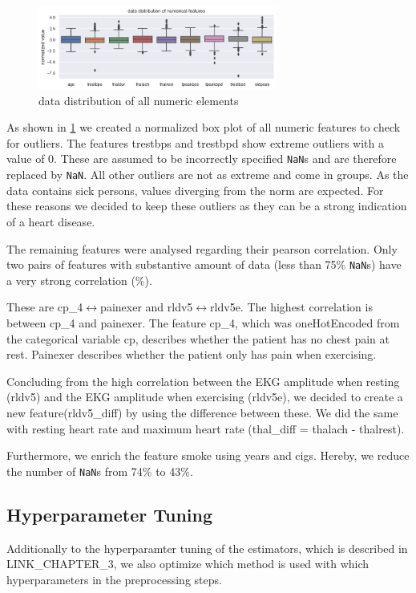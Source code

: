 \begin{figure}[h]
	\centering
	\includegraphics[width=0.7\textwidth]{images/dataDistribution.png}
	\caption{data distribution of all numeric elements}
	\label{fig:dataDistribution}
\end{figure}
As shown in \ref{fig:dataDistribution} we created a normalized box plot of all numeric features to check for outliers. The features trestbps and trestbpd show extreme outliers with a value of 0. These are assumed to be incorrectly specified \texttt{NaN}s and are therefore replaced by \texttt{NaN}. All other outliers are not as extreme and come in groups. As the data contains sick persons, values diverging from the norm are expected. For these reasons we decided to keep these outliers as they can be a strong indication of a heart disease.

The remaining features were analysed regarding their pearson correlation. Only two pairs of features with substantive amount of data (less than 75\% \texttt{NaN}s) have a very strong correlation (\%).  

These are cp\_4$\leftrightarrow$painexer and rldv5$\leftrightarrow$rldv5e. The highest correlation is between cp\_4 and painexer. The feature cp\_4, which was oneHotEncoded from the categorical variable cp, describes whether the patient has no chest pain at rest. Painexer describes whether the patient only has pain when exercising. 

Concluding from the high correlation between the EKG amplitude when resting (rldv5) and the EKG amplitude when exercising (rldv5e), we decided to create a new feature(rldv5\_diff) by using the difference between these. We did the same with resting heart rate and maximum heart rate (thal\_diff = thalach - thalrest). 

Furthermore, we enrich the feature smoke using years and cigs. Hereby, we reduce the number of \texttt{NaN}s from 74\% to 43\%. 

\subsection{Hyperparameter Tuning }
Additionally to the hyperparamter tuning of the estimators, which is described in LINK\_CHAPTER\_3, we also optimize which method is used with which hyperparameters in the preprocessing steps.

